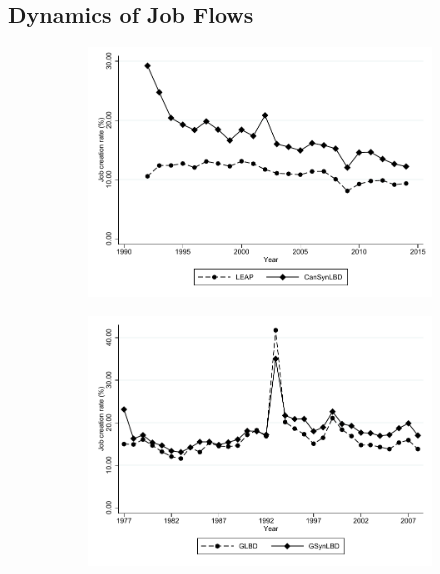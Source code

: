\documentclass[10pt,twoside]{article}
\begin{document}
\subsection{Dynamics of Job Flows}

\begin{figure}[t]
\begin{subfigure}[h]{0.48\linewidth}
\includegraphics[trim=0 40 0 0,clip, width=\linewidth]{graphs/Job_creation_rate_by_year_private_bw.pdf}
\end{subfigure}
\hfill
\begin{subfigure}[h]{0.48\linewidth}
\includegraphics[trim=0 40 0 0,clip,width=\linewidth]{graphs/Job_creation_rate_by_year_bw_GsynLBD.pdf}
\end{subfigure}\\

\end{figure}
\end{document}
